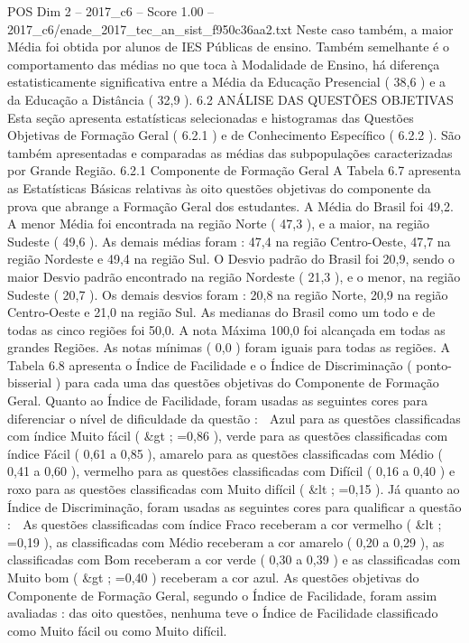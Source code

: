 \begin{textsample}{POS Dim 2 – 2017\_c6 – Score 1.00 – 2017\_c6/enade\_2017\_tec\_an\_sist\_f950c36aa2.txt}
Neste caso também, a maior Média foi obtida por alunos de IES Públicas de ensino.
Também semelhante é o comportamento das médias no que toca à Modalidade de Ensino, há diferença estatisticamente significativa entre a Média da Educação Presencial ( 38,6 ) e a da Educação a Distância ( 32,9 ). 6.2 ANÁLISE DAS QUESTÕES OBJETIVAS Esta seção apresenta estatísticas selecionadas e histogramas das Questões Objetivas de Formação Geral ( 6.2.1 ) e de Conhecimento Específico ( 6.2.2 ).
São também apresentadas e comparadas as médias das subpopulações caracterizadas por Grande Região. 6.2.1 Componente de Formação Geral A Tabela 6.7 apresenta as Estatísticas Básicas relativas às oito questões objetivas do componente da prova que abrange a Formação Geral dos estudantes.
A Média do Brasil foi 49,2.
A menor Média foi encontrada na região Norte ( 47,3 ), e a maior, na região Sudeste ( 49,6 ).
As demais médias foram : 47,4 na região Centro-Oeste, 47,7 na região Nordeste e 49,4 na região Sul.
O Desvio padrão do Brasil foi 20,9, sendo o maior Desvio padrão encontrado na região Nordeste ( 21,3 ), e o menor, na região Sudeste ( 20,7 ).
Os demais desvios foram : 20,8 na região Norte, 20,9 na região Centro-Oeste e 21,0 na região Sul.
As medianas do Brasil como um todo e de todas as cinco regiões foi 50,0.
A nota Máxima 100,0 foi alcançada em todas as grandes Regiões.
As notas mínimas ( 0,0 ) foram iguais para todas as regiões.
A Tabela 6.8 apresenta o Índice de Facilidade e o Índice de Discriminação ( ponto-bisserial ) para cada uma das questões objetivas do Componente de Formação Geral.
Quanto ao Índice de Facilidade, foram usadas as seguintes cores para diferenciar o nível de dificuldade da questão :  Azul para as questões classificadas com índice Muito fácil ( \&gt ; =0,86 ), verde para as questões classificadas com índice Fácil ( 0,61 a 0,85 ), amarelo para as questões classificadas com Médio ( 0,41 a 0,60 ), vermelho para as questões classificadas com Difícil ( 0,16 a 0,40 ) e roxo para as questões classificadas com Muito difícil ( \&lt ; =0,15 ).
Já quanto ao Índice de Discriminação, foram usadas as seguintes cores para qualificar a questão :  As questões classificadas com índice Fraco receberam a cor vermelho ( \&lt ; =0,19 ), as classificadas com Médio receberam a cor amarelo ( 0,20 a 0,29 ), as classificadas com Bom receberam a cor verde ( 0,30 a 0,39 ) e as classificadas com Muito bom ( \&gt ; =0,40 ) receberam a cor azul.
As questões objetivas do Componente de Formação Geral, segundo o Índice de Facilidade, foram assim avaliadas : das oito questões, nenhuma teve o Índice de Facilidade classificado como Muito fácil ou como Muito difícil.

\end{textsample}
